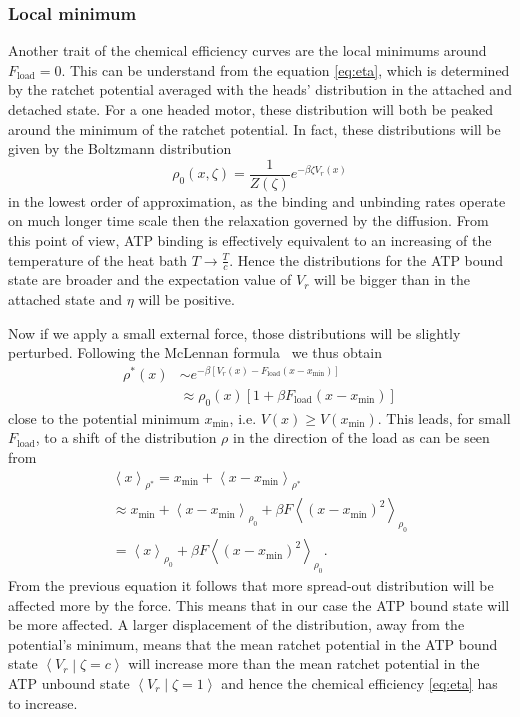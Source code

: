 \documentclass[aps,pre,twocolumn,showpacs,showkeys,superscriptaddress,floatfix]{revtex4-1}
\begin{document}
\subsubsection{Local minimum}
Another trait of the chemical efficiency curves are the local minimums around $F_\text{load}=0$. 
This can be understand from the equation \eqref{eq:eta}, which is determined by the ratchet potential averaged with the heads' distribution in the attached and detached state. 
For a one headed motor, these distribution will both be peaked around the minimum of the ratchet potential. 
In fact, these distributions will be given by the Boltzmann distribution
\begin{equation}
\rho_0(x,\zeta) = \frac{1}{Z(\zeta)} e^{-\beta \zeta V_r(x)}
\end{equation} 
in the lowest order of approximation, as the binding and unbinding rates operate on much longer time scale then the relaxation governed by the diffusion. 
From this point of view, ATP binding is effectively equivalent to an increasing of the temperature of the heat bath $T\rightarrow\frac{T}{c}$. 
Hence the distributions for the ATP bound state are broader and the expectation value of $V_r$ will be bigger than in the attached state and $\eta$ will be positive. 

Now if we apply a small external force, those distributions will be slightly perturbed. 
Following the McLennan formula~\cite{} we thus obtain %
\begin{align*}
\rho^*(x) 
&\sim e^{-\beta \left[V_r(x) - F_\text{load} \left( x - x_\text{min} \right) \right]} \\
&\approx \rho_0(x) \left[1 + \beta F_\text{load} \left( x - x_\text{min} \right) \right]
\end{align*}
close to the potential minimum $x_\text{min}$, i.e. $V(x) \ge V(x_\text{min})$. 
This leads, for small $F_\text{load}$, to a shift of the distribution $\rho$ in the direction of the load
as can be seen from 
\begin{multline}
\left\langle x \right\rangle_{\rho^*} 
= x_\text{min} + \left\langle x - x_\text{min} \right\rangle_{\rho^*}
\\
\approx x_\text{min} + \left\langle x - x_\text{min} \right\rangle_{\rho_0} 
+ \beta F \left\langle \left( x - x_\text{min} \right)^2 \right\rangle_{\rho_0} 
\\
= \left\langle x \right\rangle_{\rho_0}
+ \beta F \left\langle \left( x - x_\text{min} \right)^2 \right\rangle_{\rho_0} .
\label{eq:mean_position_shift}
\end{multline}
From the previous equation it follows that more spread-out distribution will be affected more by the force.
This means that in our case the ATP bound state will be more affected.
A larger displacement of the distribution, away from the potential's minimum, 
means that the mean ratchet potential in the ATP bound state $\left\langle V_r \middle| \zeta = c \right\rangle$ will increase more than the mean ratchet potential in the ATP unbound state $\left\langle V_r \middle| \zeta = 1 \right\rangle$ and hence the chemical efficiency \eqref{eq:eta} has to increase. 
\end{document}
